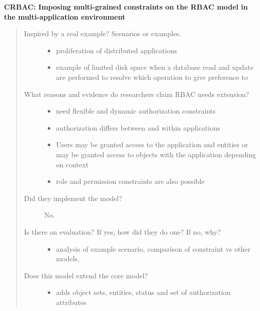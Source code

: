 \documentclass[letterpaper,10pt,english]{sphinxmanual}
\begin{document}
\textbf{CRBAC: Imposing multi-grained constraints on the RBAC model in the multi-application environment}
\begin{quote}
\begin{description}
\item[{Inspired by a real example? Scenarios or examples.}] \leavevmode\begin{itemize}
\item {} 
proliferation of distributed applications

\item {} 
example of limited disk space when a database read and update are performed to resolve which operation to give preference to

\end{itemize}

\item[{What reasons and evidence do researchers claim RBAC needs extension?}] \leavevmode\begin{itemize}
\item {} 
need flexible and dynamic authorization constraints

\item {} 
authorization differs between and within applications

\item {} 
Users may be granted access to the application and entities or may be granted access to objects with the application depending on context

\item {} 
role and permission constraints are also possible

\end{itemize}

\item[{Did they implement the model?}] \leavevmode
No.

\item[{Is there an evaluation? If yes, how did they do one? If no, why?}] \leavevmode\begin{itemize}
\item {} 
analysis of example scenario, comparison of constraint vs other models,

\end{itemize}

\item[{Does this model extend the core model?}] \leavevmode\begin{itemize}
\item {} 
adds object sets, entities, status and set of authorization attributes


\end{itemize}
\end{description}
\end{quote}
\end{document}
